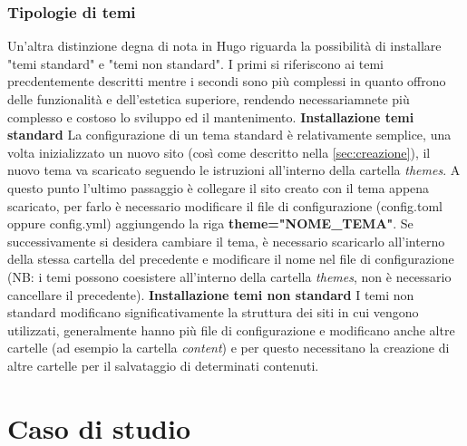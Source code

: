 \documentclass[target=bach,aauheader=]{thud}
\begin{document}
\subsection{Tipologie di temi}
Un'altra distinzione degna di nota in Hugo riguarda la possibilità di installare "temi standard" e "temi non standard". I primi si riferiscono ai temi precdentemente descritti mentre i secondi sono più complessi in quanto offrono delle funzionalità e dell'estetica superiore, rendendo necessariamnete più complesso e costoso lo sviluppo ed il mantenimento.
\newline \newline
\textbf{{\fontsize{12}{14}\selectfont Installazione temi standard}}
\newline \newline
La configurazione di un tema standard è relativamente semplice, una volta inizializzato un nuovo sito (così come descritto nella \cref{sec:creazione}), il nuovo tema va scaricato seguendo le istruzioni all'interno della cartella \textit{themes}. 
A questo punto l'ultimo passaggio è collegare il sito creato con il tema appena scaricato, per farlo è necessario modificare il file di configurazione (config.toml oppure config.yml) aggiungendo la riga \textbf{theme="NOME\_TEMA"}.
\newline
Se successivamente si desidera cambiare il tema, è necessario scaricarlo all'interno della stessa cartella del precedente e modificare il nome nel file di configurazione (NB: i temi possono coesistere all'interno della cartella \textit{themes}, non è necessario cancellare il precedente).
\newline \newline
\textbf{{\fontsize{12}{14}\selectfont Installazione temi non standard}}
\newline \newline
I temi non standard modificano significativamente la struttura dei siti in cui vengono utilizzati, generalmente hanno più file di configurazione e modificano anche altre cartelle (ad esempio la cartella \textit{content}) e per questo necessitano la creazione di altre cartelle per il salvataggio di determinati contenuti.


\chapter{Caso di studio}\label{cap:casostudio}
\end{document}
